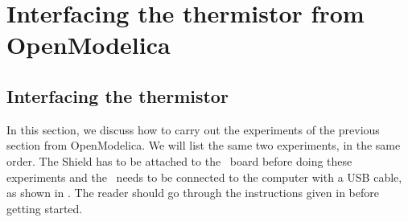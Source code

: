 \section{Interfacing the thermistor from OpenModelica}
\subsection{Interfacing the thermistor}
In this section, we discuss how to carry out the experiments of the
previous section from OpenModelica.  We will list the same two experiments,
in the same order.  The Shield has to be attached to the \arduino\ board
before doing these experiments and the \arduino\ needs to be connected to the computer
with a USB cable, as shown in .
The reader should go through the instructions given in
 before getting started.


